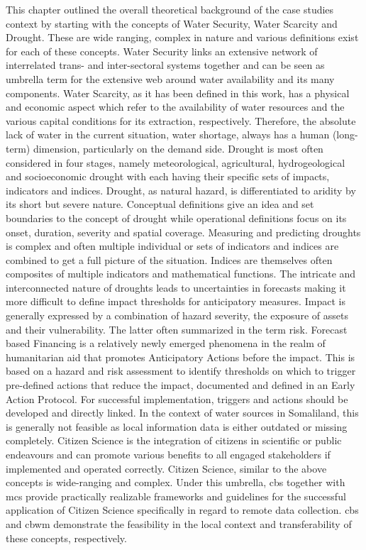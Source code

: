 This chapter outlined the overall theoretical background of the case studies context by starting with the concepts of Water Security, Water Scarcity and Drought. These are wide ranging, complex in nature and various definitions exist for each of these concepts. Water Security links an extensive network of interrelated trans- and inter-sectoral systems together and can be seen as umbrella term for the extensive web around water availability and its many components. Water Scarcity, as it has been defined in this work, has a physical and economic aspect which refer to the availability of water resources and the various capital conditions for its extraction, respectively. Therefore, the absolute lack of water in the current situation, water shortage, always has a human (long-term) dimension, particularly on the demand side. Drought is most often considered in four stages, namely meteorological, agricultural, hydrogeological and socioeconomic drought with each having their specific sets of impacts, indicators and indices. Drought, as natural hazard, is differentiated to aridity by its short but severe nature. Conceptual definitions give an idea and set boundaries to the concept of drought while operational definitions focus on its onset, duration, severity and spatial coverage.\newline
Measuring and predicting droughts is complex and often multiple individual or sets of indicators and indices are combined to get a full picture of the situation. Indices are themselves often composites of multiple indicators and mathematical functions. The intricate and interconnected nature of droughts leads to uncertainties in forecasts making it more difficult to define impact thresholds for anticipatory measures. Impact is generally expressed by a combination of hazard severity, the exposure of assets and their vulnerability. The latter often summarized in the term risk.
Forecast based Financing is a relatively newly emerged phenomena in the realm of humanitarian aid that promotes Anticipatory Actions before the impact. This is based on a hazard and risk assessment to identify thresholds on which to trigger pre-defined actions that reduce the impact, documented and defined in an Early Action Protocol. For successful implementation, triggers and actions should be developed and directly linked. In the context of water sources in Somaliland, this is generally not feasible as local information data is either outdated or missing completely.
Citizen Science is the integration of citizens in scientific or public endeavours and can promote various benefits to all engaged stakeholders if implemented and operated correctly. Citizen Science, similar to the above concepts is wide-ranging and complex. Under this umbrella, \acrlong{cbs} together with \acrlong{mcs} provide practically realizable frameworks and guidelines for the successful application of Citizen Science specifically in regard to remote data collection. \acrlong{cbs} and \acrlong{cbwm} demonstrate the feasibility in the local context and transferability of these concepts, respectively.\newline
